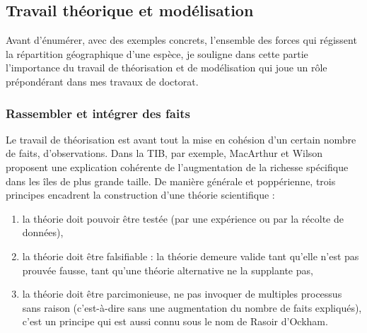 \subsection*{Travail théorique et
modélisation}\label{travail-thuxe9orique-et-moduxe9lisation}

Avant d'énumérer, avec des exemples concrets, l'ensemble des forces qui
régissent la répartition géographique d'une espèce, je souligne dans
cette partie l'importance du travail de théorisation et de modélisation
qui joue un rôle prépondérant dans mes travaux de doctorat.

\subsubsection*{Rassembler et intégrer des
faits}\label{rassembler-et-intuxe9grer-des-faits}

Le travail de théorisation est avant tout la mise en cohésion d'un
certain nombre de faits, d'observations. Dans la TIB, par exemple,
MacArthur et Wilson proposent une explication cohérente de
l'augmentation de la richesse spécifique dans les îles de plus grande
taille. De manière générale et poppérienne, trois principes encadrent la
construction d'une théorie scientifique :

\begin{enumerate}
\def\labelenumi{\arabic{enumi}.}
\tightlist
\item
  la théorie doit pouvoir être testée (par une expérience ou par la
  récolte de données),\\
\item
  la théorie doit être falsifiable : la théorie demeure valide tant
  qu'elle n'est pas prouvée fausse, tant qu'une théorie alternative ne
  la supplante pas,\\
\item
  la théorie doit être parcimonieuse, ne pas invoquer de multiples
  processus sans raison (c'est-à-dire sans une augmentation du nombre de
  faits expliqués), c'est un principe qui est aussi connu sous le nom de
  Rasoir d'Ockham.
\end{enumerate}

